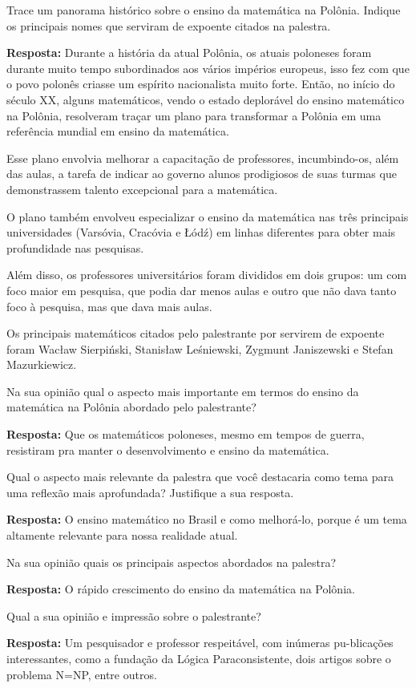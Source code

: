 \documentclass{article}
\begin{document}
\begin{enumerate}

{\bf \item Trace um panorama histórico sobre o ensino da matemática na Polônia. Indique os principais nomes que serviram de expoente citados na palestra.}

{\bf Resposta:} Durante a história da atual Polônia, os atuais poloneses foram durante muito tempo subordinados aos vários impérios europeus, isso fez com que o povo polonês criasse um espírito nacionalista muito forte. Então, no início do século XX, alguns matemáticos, vendo o estado deplorável do ensino matemático na Polônia, resolveram traçar um plano para transformar a Polônia em uma referência mundial em ensino da matemática.

Esse plano envolvia melhorar a capacitação de professores, incumbindo-os, além das aulas, a tarefa de indicar ao governo alunos prodigiosos de suas turmas que demonstrassem talento excepcional para a matemática.

O plano também envolveu especializar o ensino da matemática nas três principais universidades (Varsóvia, Cracóvia e Łódź) em linhas diferentes para obter mais profundidade nas pesquisas.

Além disso, os professores universitários foram divididos em dois grupos: um com foco maior em pesquisa, que podia dar menos aulas e outro que não dava tanto foco à pesquisa, mas que dava mais aulas.

Os principais matemáticos citados pelo palestrante por servirem de expoente foram Wacław Sierpiński, Stanisław Leśniewski, Zygmunt Janiszewski e Stefan Mazurkiewicz.

{\bf \item Na sua opinião qual o aspecto mais importante em termos do ensino da matemática na Polônia abordado pelo palestrante?}

{\bf Resposta:} Que os matemáticos poloneses, mesmo em tempos de guerra, resistiram pra manter o desenvolvimento e ensino da matemática.

{\bf \item Qual o aspecto mais relevante da palestra que você destacaria como tema para uma reflexão mais aprofundada? Justifique a sua resposta.}

{\bf Resposta:} O ensino matemático no Brasil e como melhorá-lo, porque é um tema altamente relevante para nossa realidade atual.

{\bf \item Na sua opinião quais os principais aspectos abordados na palestra?}

{\bf Resposta:} O rápido crescimento do ensino da matemática na Polônia.

{\bf \item Qual a sua opinião e impressão sobre o palestrante?}

{\bf Resposta:} Um pesquisador e professor respeitável, com inúmeras pu-blicações interessantes, como a fundação da Lógica Paraconsistente, dois artigos sobre o problema N=NP, entre outros.

\end{enumerate}
\end{document}
